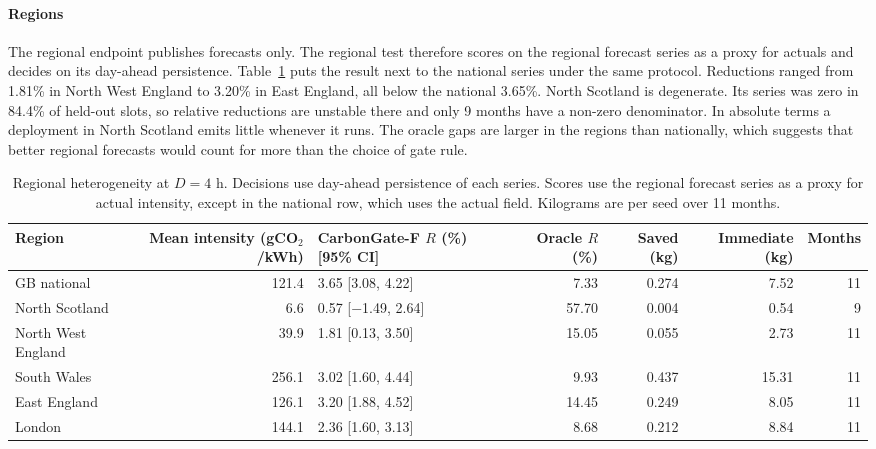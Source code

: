 \documentclass[journal]{IEEEtran}
\begin{document}
\paragraph{Regions} The regional endpoint publishes forecasts only. The regional test therefore scores on the regional forecast series as a proxy for actuals and decides on its day-ahead persistence. Table~\ref{tab:region} puts the result next to the national series under the same protocol. Reductions ranged from 1.81\% in North West England to 3.20\% in East England, all below the national 3.65\%. North Scotland is degenerate. Its series was zero in 84.4\% of held-out slots, so relative reductions are unstable there and only 9 months have a non-zero denominator. In absolute terms a deployment in North Scotland emits little whenever it runs. The oracle gaps are larger in the regions than nationally, which suggests that better regional forecasts would count for more than the choice of gate rule.

\begin{table}[!t]
\caption{Regional heterogeneity at $D = 4$ h. Decisions use day-ahead persistence of each series. Scores use the regional forecast series as a proxy for actual intensity, except in the national row, which uses the actual field. Kilograms are per seed over 11 months.}
\label{tab:region}
\centering
\footnotesize
\begin{tabular}{@{}lrlrrrr@{}}
\toprule
Region & Mean intensity (gCO$_2$/kWh) & CarbonGate-F $R$ (\%) [95\% CI] & Oracle $R$ (\%) & Saved (kg) & Immediate (kg) & Months \\
\midrule
GB national & 121.4 & 3.65 [3.08, 4.22] & 7.33 & 0.274 & 7.52 & 11 \\
North Scotland & 6.6 & 0.57 [$-$1.49, 2.64] & 57.70 & 0.004 & 0.54 & 9 \\
North West England & 39.9 & 1.81 [0.13, 3.50] & 15.05 & 0.055 & 2.73 & 11 \\
South Wales & 256.1 & 3.02 [1.60, 4.44] & 9.93 & 0.437 & 15.31 & 11 \\
East England & 126.1 & 3.20 [1.88, 4.52] & 14.45 & 0.249 & 8.05 & 11 \\
London & 144.1 & 2.36 [1.60, 3.13] & 8.68 & 0.212 & 8.84 & 11 \\
\bottomrule
\end{tabular}
\end{table}
\end{document}
